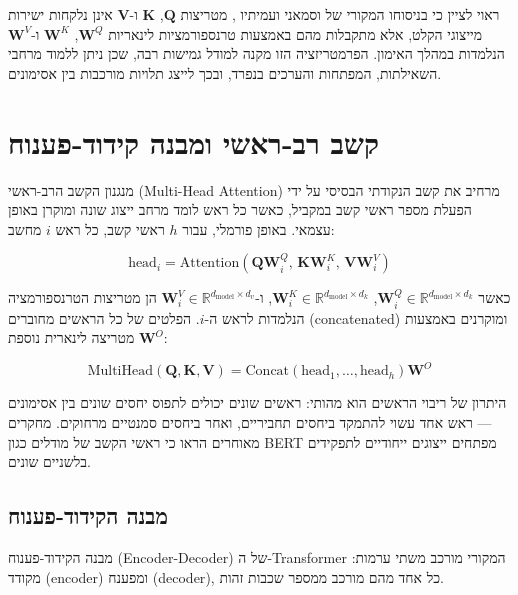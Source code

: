 ראוי לציין כי בניסוחו המקורי של וסמאני ועמיתיו \cite{vaswani2017attention},
מטריצות \(\mathbf{Q}\), \(\mathbf{K}\) ו-\(\mathbf{V}\) אינן נלקחות ישירות
מייצוגי הקלט, אלא מתקבלות מהם באמצעות טרנספורמציות לינאריות
\(\mathbf{W}^Q\), \(\mathbf{W}^K\) ו-\(\mathbf{W}^V\) הנלמדות במהלך האימון.
הפרמטריזציה הזו מקנה למודל גמישות רבה, שכן ניתן ללמוד מרחבי השאילתות,
המפתחות והערכים בנפרד, ובכך לייצג תלויות מורכבות בין אסימונים.


\section{קשב רב-ראשי ומבנה קידוד-פענוח}

מנגנון הקשב הרב-ראשי (\textenglish{Multi-Head Attention}) מרחיב את
קשב הנקודתי הבסיסי על ידי הפעלת מספר ראשי קשב במקביל,
כאשר כל ראש לומד מרחב ייצוג שונה ומוקרן באופן עצמאי.
באופן פורמלי, עבור \(h\) ראשי קשב, כל ראש \(i\) מחשב:

\begin{equation}
  \text{head}_i = \text{Attention}\!\left(\mathbf{Q}\mathbf{W}_i^Q,\,
  \mathbf{K}\mathbf{W}_i^K,\,
  \mathbf{V}\mathbf{W}_i^V\right)
\end{equation}

כאשר \(\mathbf{W}_i^Q \in \mathbb{R}^{d_{\text{model}} \times d_k}\),
\(\mathbf{W}_i^K \in \mathbb{R}^{d_{\text{model}} \times d_k}\),
ו-\(\mathbf{W}_i^V \in \mathbb{R}^{d_{\text{model}} \times d_v}\)
הן מטריצות הטרנספורמציה הנלמדות לראש ה-\(i\).
הפלטים של כל הראשים מחוברים (\textenglish{concatenated}) ומוקרנים
באמצעות מטריצה לינארית נוספת \(\mathbf{W}^O\):

\begin{equation}
  \text{MultiHead}(\mathbf{Q}, \mathbf{K}, \mathbf{V}) =
  \text{Concat}\!\left(\text{head}_1, \ldots, \text{head}_h\right)\mathbf{W}^O
\end{equation}

היתרון של ריבוי הראשים הוא מהותי: ראשים שונים יכולים לתפוס
יחסים שונים בין אסימונים — ראש אחד עשוי להתמקד ביחסים
תחביריים, ואחר ביחסים סמנטיים מרחוקים.
מחקרים מאוחרים \cite{clark2020electra} הראו כי ראשי הקשב של
מודלים כגון \textenglish{BERT} \cite{devlin2019bert} מפתחים
ייצוגים ייחודיים לתפקידים בלשניים שונים.

\subsection*{מבנה הקידוד-פענוח}

מבנה הקידוד-פענוח (\textenglish{Encoder-Decoder}) של
ה-\textenglish{Transformer} המקורי \cite{vaswani2017attention}
מורכב משתי ערמות: מקודד (\textenglish{encoder}) ומפענח
(\textenglish{decoder}), כל אחד מהם מורכב ממספר שכבות זהות.

